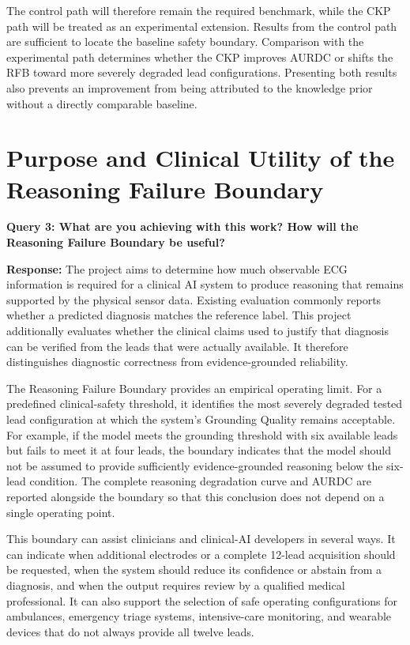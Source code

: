 \documentclass{ssnreview}
\begin{document}
The control path will therefore remain the required benchmark, while the CKP path will be
treated as an experimental extension. Results from the control path are sufficient to locate
the baseline safety boundary. Comparison with the experimental path determines whether
the CKP improves AURDC or shifts the RFB toward more severely degraded lead
configurations. Presenting both results also prevents an improvement from being attributed
to the knowledge prior without a directly comparable baseline.

\section{Purpose and Clinical Utility of the Reasoning Failure Boundary}

\textbf{Query 3: What are you achieving with this work? How will the Reasoning Failure
Boundary be useful?}

\textbf{Response:} The project aims to determine how much observable ECG information is
required for a clinical AI system to produce reasoning that remains supported by the
physical sensor data. Existing evaluation commonly reports whether a predicted diagnosis
matches the reference label. This project additionally evaluates whether the clinical claims
used to justify that diagnosis can be verified from the leads that were actually available.
It therefore distinguishes diagnostic correctness from evidence-grounded reliability.

The Reasoning Failure Boundary provides an empirical operating limit. For a predefined
clinical-safety threshold, it identifies the most severely degraded tested lead configuration
at which the system's Grounding Quality remains acceptable. For example, if the model
meets the grounding threshold with six available leads but fails to meet it at four leads,
the boundary indicates that the model should not be assumed to provide sufficiently
evidence-grounded reasoning below the six-lead condition. The complete reasoning
degradation curve and AURDC are reported alongside the boundary so that this conclusion
does not depend on a single operating point.

This boundary can assist clinicians and clinical-AI developers in several ways. It can
indicate when additional electrodes or a complete 12-lead acquisition should be requested,
when the system should reduce its confidence or abstain from a diagnosis, and when the
output requires review by a qualified medical professional. It can also support the
selection of safe operating configurations for ambulances, emergency triage systems,
intensive-care monitoring, and wearable devices that do not always provide all twelve
leads.
\end{document}
